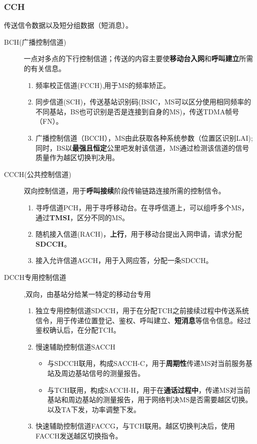 \subsubsection{CCH}
传送信令数据以及短分组数据（短消息）。
\begin{description}
	\item[BCH(广播控制信道)] 一点对多点的下行控制信道；传送的内容主要使\textbf{移动台入网}和\textbf{呼叫建立}所需的有关信息。
	\begin{enumerate}
		\item 频率校正信道(FCCH),用于MS的频率矫正。
		\item 同步信道(SCH)，传送基站识别码(BSIC，MS可以区分使用相同频率的不同基站，BS也可识别是否是连接到自身的MS)，传送TDMA帧号（FN）。
		\item 广播控制信道（BCCH），MS由此获取各种系统参数（位置区识别LAI);同时，BS以\textbf{最强且恒定}公里吧发射该信道，MS通过检测该信道的信号质量作为越区切换判决用。
	\end{enumerate}
	\item [CCCH(公共控制信道)]双向控制信道，用于\textbf{呼叫接续}阶段传输链路连接所需的控制信令。
	\begin{enumerate}
		\item 寻呼信道PCH，用于寻呼移动台。在寻呼信道上，可以组呼多个MS，通过\textbf{TMSI}，区分不同的MS。
		\item 随机接入信道(RACH)，\textbf{上行}，用于移动台提出入网申请，请求分配\textbf{SDCCH}。
		\item 接入允许信道AGCH，用于入网应答，分配一条SDCCH。
	\end{enumerate}
	\item [DCCH专用控制信道],双向，由基站分给某一特定的移动台专用
	\begin{enumerate}
		\item 独立专用控制信道SDCCH，用于在分配TCH之前接续过程中传送系统信令，用于传递位置登记、鉴权、呼叫建立、\textbf{短消息}等信令信息。经过鉴权确认后，在分配TCH。
		\item 慢速辅助控制信道SACCH
		\begin{itemize}
			\item 与SDCCH联用，构成SACCH-C，用于\textbf{周期性}传递MS对当前服务基站及周边基站信号的测量报告。
			\item 与TCH联用，构成SACCH-H，用于在\textbf{通话过程中}，传递MS对当前基站和周边基站的测量报告，用于网络判决MS是否需要越区切换。以及TA下发，功率调整下发。
		\end{itemize}
		\item 快速辅助控制信道FACCG，与TCH联用。越区切换判决后，使用FACCH发送越区切换指令。
	\end{enumerate}
\end{description}
